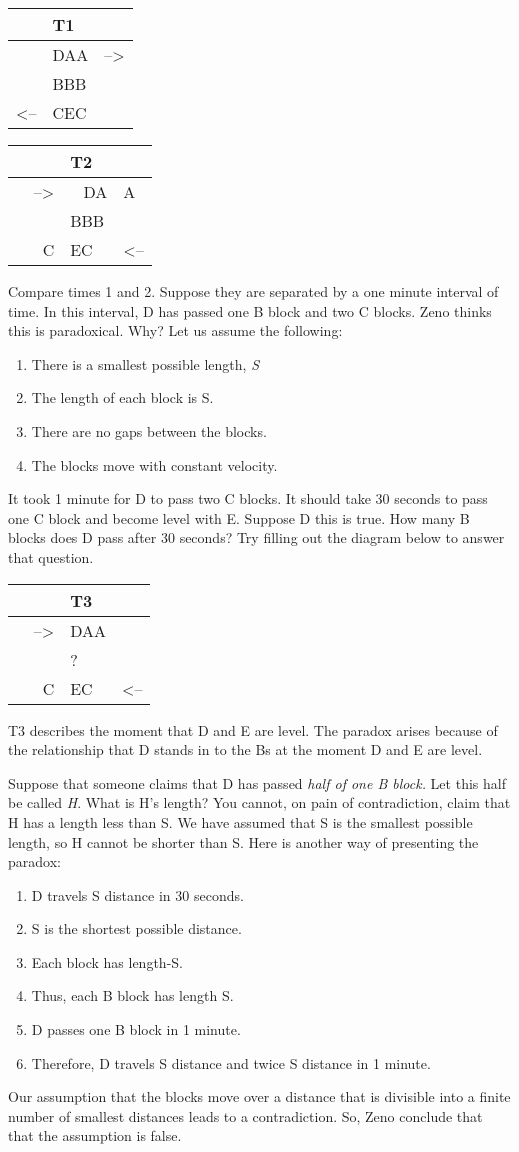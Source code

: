 \documentclass[oneside]{article}
\begin{document}
\begin{longtable}[c]{@{}lll@{}}
\toprule
& T1 &\tabularnewline
\midrule
\endhead
& DAA & --\textgreater{}\tabularnewline
& BBB &\tabularnewline
\textless{}-- & CEC &\tabularnewline
\end{longtable}

\begin{longtable}[c]{@{}rll@{}}
\toprule
& T2 &\tabularnewline
\midrule
\endhead
--\textgreater{} & ~ DA & A\tabularnewline
& BBB &\tabularnewline
~ ~ C & EC~ & \textless{}--\tabularnewline
\end{longtable}
Compare times 1 and 2. Suppose they are separated by a one minute
interval of time. In this interval, D has passed one B block and two C blocks. Zeno thinks this is paradoxical. Why? Let us assume the following:

\begin{enumerate}
\item
  There is a smallest possible length, \emph{S}
\item
  The length of each block is S.
\item
  There are no gaps between the blocks.
\item
  The blocks move with constant velocity.
\end{enumerate}
It took 1 minute for D to pass two C blocks. It should take 30 seconds to
pass one C block and become level with E. Suppose D this is true. How many B blocks does D pass after 30 seconds?  Try filling out the diagram below to answer that question.

\begin{longtable}[c]{@{}rll@{}}
\toprule
& T3 &\tabularnewline
\midrule
\endhead
--\textgreater{} & DAA &\tabularnewline
& ? &\tabularnewline
~ ~ C & EC~ & \textless{}--\tabularnewline
\end{longtable}

T3 describes the moment that D and E are level. The paradox arises because of the relationship that D stands in to the Bs at the moment D and E are level.

Suppose that someone claims that D has passed \emph{half
of one B block.} Let this half be called \emph{H}. What is H's length?
You cannot, on pain of contradiction, claim that H has a length less
than S. We have assumed that S is the smallest possible length, so H
cannot be shorter than S. Here is another way of presenting the paradox:

\begin{enumerate}
\item D travels S distance in 30 seconds. 
\item S is the shortest possible distance. 
\item Each block has length-S.
\item Thus, each B block has length S.
\item D passes one B block in 1 minute. 
\item Therefore, D travels S distance and twice S distance in 1 minute. 
\end{enumerate} 
Our assumption that the blocks move over a distance that is divisible into a finite number of smallest distances leads to a contradiction. So, Zeno conclude that that the assumption is false. 
\end{document}
